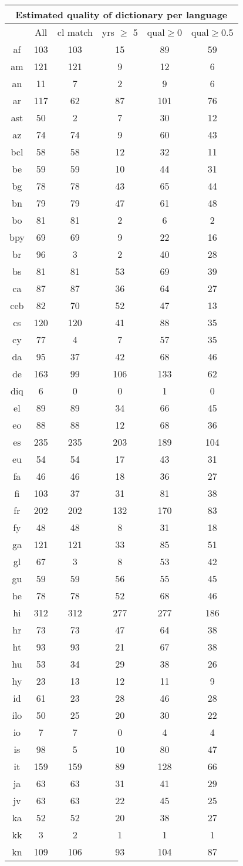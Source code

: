 \begin{figure}[h]
\centering
\begin{tabular}{cccccc}
\multicolumn{6}{c}{Estimated quality of dictionary per language}\\
\hline\hline
&All&cl match&yrs $\geq$ 5&qual$\geq$0&qual$\geq$0.5\\
\hline\hline
af&103&103&15&89&59\\
am&121&121&9&12&6\\
an&11&7&2&9&6\\
ar&117&62&87&101&76\\
ast&50&2&7&30&12\\
az&74&74&9&60&43\\
bcl&58&58&12&32&11\\
be&59&59&10&44&31\\
bg&78&78&43&65&44\\
bn&79&79&47&61&48\\
bo&81&81&2&6&2\\
bpy&69&69&9&22&16\\
br&96&3&2&40&28\\
bs&81&81&53&69&39\\
ca&87&87&36&64&27\\
ceb&82&70&52&47&13\\
cs&120&120&41&88&35\\
cy&77&4&7&57&35\\
da&95&37&42&68&46\\
de&163&99&106&133&62\\
diq&6&0&0&1&0\\
el&89&89&34&66&45\\
eo&88&88&12&68&36\\
es&235&235&203&189&104\\
eu&54&54&17&43&31\\
fa&46&46&18&36&27\\
fi&103&37&31&81&38\\
fr&202&202&132&170&83\\
fy&48&48&8&31&18\\
ga&121&121&33&85&51\\
gl&67&3&8&53&42\\
gu&59&59&56&55&45\\
he&78&78&52&68&46\\
hi&312&312&277&277&186\\
hr&73&73&47&64&38\\
ht&93&93&21&67&38\\
hu&53&34&29&38&26\\
hy&23&13&12&11&9\\
id&61&23&28&46&28\\
ilo&50&25&20&30&22\\
io&7&7&0&4&4\\
is&98&5&10&80&47\\
it&159&159&89&128&66\\
ja&63&63&31&41&29\\
jv&63&63&22&45&25\\
ka&52&52&20&38&27\\
kk&3&2&1&1&1\\
kn&109&106&93&104&87\\
\end{tabular}
\end{figure}
